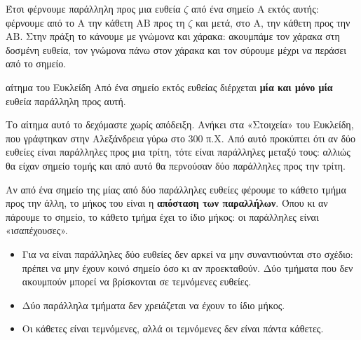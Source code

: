 Έτσι φέρνουμε παράλληλη προς μια ευθεία $\zeta$ από ένα σημείο $\mathrm{Α}$ εκτός αυτής: φέρνουμε από το $\mathrm{Α}$ την κάθετη $\mathrm{ΑΒ}$ προς τη $\zeta$ και μετά, στο $\mathrm{Α}$, την κάθετη προς την $\mathrm{ΑΒ}$. Στην πράξη το κάνουμε με γνώμονα και χάρακα: ακουμπάμε τον χάρακα στη δοσμένη ευθεία, τον γνώμονα πάνω στον χάρακα και τον σύρουμε μέχρι να περάσει από το σημείο.

\begin{idiotita}{αίτημα του Ευκλείδη}
Από ένα σημείο εκτός ευθείας διέρχεται \textbf{μία και μόνο μία} ευθεία παράλληλη προς αυτή.
\end{idiotita}

Το αίτημα αυτό το δεχόμαστε χωρίς απόδειξη. Ανήκει στα «Στοιχεία» του Ευκλείδη, που γράφτηκαν στην Αλεξάνδρεια γύρω στο $300$ π.Χ. Από αυτό προκύπτει ότι αν δύο ευθείες είναι παράλληλες προς μια τρίτη, τότε είναι παράλληλες μεταξύ τους: αλλιώς θα είχαν σημείο τομής και από αυτό θα περνούσαν δύο παράλληλες προς την τρίτη.


Αν από ένα σημείο της μίας από δύο παράλληλες ευθείες φέρουμε το κάθετο τμήμα προς την άλλη, το μήκος του είναι η \textbf{απόσταση των παραλλήλων}. Όπου κι αν πάρουμε το σημείο, το κάθετο τμήμα έχει το ίδιο μήκος: οι παράλληλες είναι «ισαπέχουσες».

\begin{center}
\end{center}

\begin{prosoxi}
\begin{itemize}[leftmargin=1.2em,itemsep=0.3ex,topsep=2pt]
\item Για να είναι παράλληλες δύο ευθείες δεν αρκεί να μην συναντιούνται στο σχέδιο: πρέπει να μην έχουν κοινό σημείο όσο κι αν προεκταθούν. Δύο τμήματα που δεν ακουμπούν μπορεί να βρίσκονται σε τεμνόμενες ευθείες.
\item Δύο παράλληλα τμήματα δεν χρειάζεται να έχουν το ίδιο μήκος.
\item Οι κάθετες είναι τεμνόμενες, αλλά οι τεμνόμενες δεν είναι πάντα κάθετες.
\end{itemize}
\end{prosoxi}

